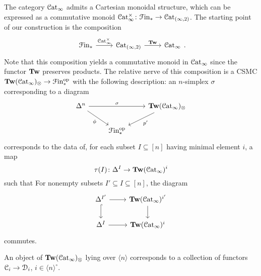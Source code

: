 \documentclass[main.tex]{subfiles}
\begin{document}
\begin{construction}
  The category $\mathcal{C}\mathrm{at}_{\infty}$ admits a Cartesian monoidal structure, which can be expressed as a commutative monoid $\mathcal{C}\mathrm{at}_{\infty}^{\times}\colon \mathcal{F}\mathrm{in}_{*} \to \mathcal{C}\mathrm{at}_{(\infty,2)}$. The starting point of our construction is the composition
  \begin{equation*}
    \begin{tikzcd}
      \Finp
      \arrow[r, "\ICat^{\times}"]
      & \Cat_{(\infty, 2)}
      \arrow[r, "\Tw"]
      & \ICat
    \end{tikzcd}.
  \end{equation*}
  Note that this composition yields a commutative monoid in $\mathcal{C}\mathrm{at}_{\infty}$ since the functor $\mathbf{Tw}$ preserves products. The relative nerve of this composition is a CSMC $\mathbf{Tw}(\mathcal{C}\mathrm{at}_{\infty})_{\otimes} \to \mathcal{F}\mathrm{in}_{*}^{\mathrm{op}}$ with the following description: an $n$-simplex $\sigma$ corresponding to a diagram
  \begin{equation*}
    \begin{tikzcd}
      \Delta^{n}
      \arrow[rr, "\sigma"]
      \arrow[dr, swap, "\phi"]
      && \Tw(\ICat)_{\otimes}
      \arrow[dl, "p'"]
      \\
      & \Finp\op
    \end{tikzcd}
  \end{equation*}
  corresponds to the data of, for each subset $I \subseteq [n]$ having minimal element $i$, a map
  \begin{equation*}
    \tau(I)\colon \Delta^{I} \to \mathbf{Tw}(\mathcal{C}\mathrm{at}_{\infty})^{i}
  \end{equation*}
  such that For nonempty subsets $I' \subseteq I \subseteq [n]$, the diagram
  \begin{equation*}
    \begin{tikzcd}
      \Delta^{I'}
      \arrow[r]
      \arrow[d, hook]
      & \Tw(\ICat)^{i'}
      \arrow[d]
      \\
      \Delta^{I}
      \arrow[r]
      & \Tw(\ICat)^{i}
    \end{tikzcd}
  \end{equation*}
  commutes.
\end{construction}

\begin{example}
  An object of $\mathbf{Tw}(\mathcal{C}\mathrm{at}_{\infty})_{\otimes}$ lying over $\langle n \rangle$ corresponds to a collection of functors $\mathcal{C}_{i} \to \mathcal{D}_{i}$, $i \in \langle n \rangle^{\circ}$.
\end{example}
\end{document}
